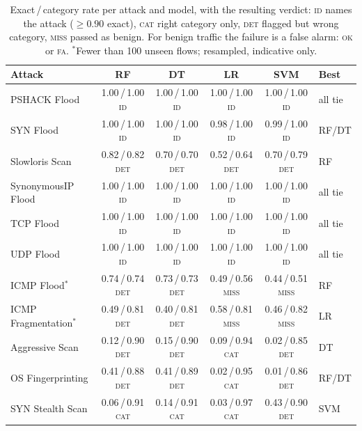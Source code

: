 \documentclass[11pt, a4paper]{article}
\begin{document}
\begin{table}[h]
\centering
\caption{Exact\,/\,category rate per attack and model, with the resulting
         verdict: \textsc{id} names the attack ($\geq 0.90$ exact),
         \textsc{cat} right category only, \textsc{det} flagged but wrong
         category, \textsc{miss} passed as benign. For benign traffic the
         failure is a false alarm: \textsc{ok} or \textsc{fa}. $^{*}$Fewer than
         100 unseen flows; resampled, indicative only.}
\footnotesize
\setlength{\tabcolsep}{3.5pt}
\begin{tabular}{lccccl}
\toprule
\textbf{Attack} & \textbf{RF} & \textbf{DT} & \textbf{LR} & \textbf{SVM} & \textbf{Best} \\
\midrule
PSHACK Flood & 1.00\,/\,1.00 \textsc{id} & 1.00\,/\,1.00 \textsc{id} & 1.00\,/\,1.00 \textsc{id} & 1.00\,/\,1.00 \textsc{id} & all tie \\
SYN Flood & 1.00\,/\,1.00 \textsc{id} & 1.00\,/\,1.00 \textsc{id} & 0.98\,/\,1.00 \textsc{id} & 0.99\,/\,1.00 \textsc{id} & RF/DT \\
Slowloris Scan & 0.82\,/\,0.82 \textsc{det} & 0.70\,/\,0.70 \textsc{det} & 0.52\,/\,0.64 \textsc{det} & 0.70\,/\,0.79 \textsc{det} & RF \\
SynonymousIP Flood & 1.00\,/\,1.00 \textsc{id} & 1.00\,/\,1.00 \textsc{id} & 1.00\,/\,1.00 \textsc{id} & 1.00\,/\,1.00 \textsc{id} & all tie \\
TCP Flood & 1.00\,/\,1.00 \textsc{id} & 1.00\,/\,1.00 \textsc{id} & 1.00\,/\,1.00 \textsc{id} & 1.00\,/\,1.00 \textsc{id} & all tie \\
UDP Flood & 1.00\,/\,1.00 \textsc{id} & 1.00\,/\,1.00 \textsc{id} & 1.00\,/\,1.00 \textsc{id} & 1.00\,/\,1.00 \textsc{id} & all tie \\
ICMP Flood$^{*}$ & 0.74\,/\,0.74 \textsc{det} & 0.73\,/\,0.73 \textsc{det} & 0.49\,/\,0.56 \textsc{miss} & 0.44\,/\,0.51 \textsc{miss} & RF \\
ICMP Fragmentation$^{*}$ & 0.49\,/\,0.81 \textsc{det} & 0.40\,/\,0.81 \textsc{det} & 0.58\,/\,0.81 \textsc{miss} & 0.46\,/\,0.82 \textsc{miss} & LR \\
\midrule
Aggressive Scan & 0.12\,/\,0.90 \textsc{det} & 0.15\,/\,0.90 \textsc{det} & 0.09\,/\,0.94 \textsc{cat} & 0.02\,/\,0.85 \textsc{det} & DT \\
OS Fingerprinting & 0.41\,/\,0.88 \textsc{det} & 0.41\,/\,0.89 \textsc{det} & 0.02\,/\,0.95 \textsc{cat} & 0.01\,/\,0.86 \textsc{det} & RF/DT \\
SYN Stealth Scan & 0.06\,/\,0.91 \textsc{cat} & 0.14\,/\,0.91 \textsc{cat} & 0.03\,/\,0.97 \textsc{cat} & 0.43\,/\,0.90 \textsc{det} & SVM \\

\end{tabular}
\end{table}
\end{document}
